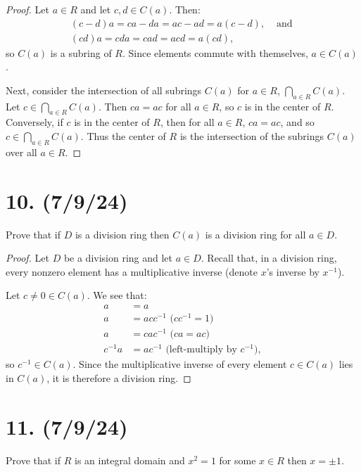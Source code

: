 \documentclass{article}
\begin{document}
\begin{proof}
    Let $a \in R$ and let $c, d \in C(a)$. Then:
    \begin{align*}
        (c - d)a = ca - da = ac - ad = a(c - d),& \text{ and } \\
        (cd)a = cda = cad = acd = a(cd),&
    \end{align*}
    so $C(a)$ is a subring of $R$. Since elements commute with themselves, $a \in C(a)$.

    Next, consider the intersection of all subrings $C(a)$ for $a \in R$, $\bigcap_{a \in R} C(a)$. Let $c \in \bigcap_{a \in R} C(a)$. Then $ca = ac$ for all $a \in R$, so $c$ is in the center of $R$. Conversely, if $c$ is in the center of $R$, then for all $a \in R$, $ca = ac$, and so $c \in \bigcap_{a \in R} C(a)$. Thus the center of $R$ is the intersection of the subrings $C(a)$ over all $a \in R$.
\end{proof}

\section*{10. (7/9/24)}

Prove that if $D$ is a division ring then $C(a)$ is a division ring for all $a \in D$.

\begin{proof}
    Let $D$ be a division ring and let $a \in D$. Recall that, in a division ring, every nonzero element has a multiplicative inverse (denote $x$'s inverse by $x^{-1}$).

    Let $c \neq 0 \in C(a)$. We see that:
    \begin{align*}
        a &= a \\
        a &= a c c^{-1} \text{ ($cc^{-1} = 1$)}\\
        a &= c a c^{-1} \text{ ($ca = ac$)}\\
        c^{-1} a &= a c^{-1} \text{ (left-multiply by $c^{-1}$)},
    \end{align*}
    so $c^{-1} \in C(a)$. Since the multiplicative inverse of every element $c \in C(a)$ lies in $C(a)$, it is therefore a division ring.
\end{proof}

\section*{11. (7/9/24)}

Prove that if $R$ is an integral domain and $x^2 = 1$ for some $x \in R$ then $x = \pm 1$.
\end{document}
